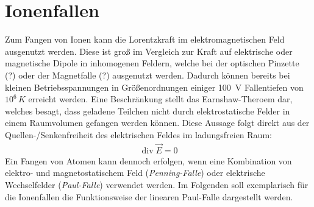 \documentclass[twocolumn]{revtex4}
\DeclareMathOperator{\divergence}{div}
\begin{document}
\section{Ionenfallen}
Zum Fangen von Ionen kann die Lorentzkraft im elektromagnetischen Feld ausgenutzt werden.
Diese ist groß im Vergleich zur Kraft auf elektrische oder magnetische Dipole in inhomogenen Feldern, welche bei der optischen Pinzette (?) oder der Magnetfalle (?) ausgenutzt werden.
Dadurch können bereits bei kleinen Betriebsspannungen in Größenordnungen einiger \SI{100}{V} Fallentiefen von $10^6 \, \si{K}$ erreicht werden.
Eine Beschränkung stellt das Earnshaw-Theroem dar, welches besagt, dass geladene Teilchen nicht durch elektrostatische Felder in einem Raumvolumen gefangen werden können.
Diese Aussage folgt direkt aus der Quellen-/Senkenfreiheit des elektrischen Feldes im ladungsfreien Raum:
\begin{align}
	\divergence \vec{E} = 0
\end{align}
Ein Fangen von Atomen kann dennoch erfolgen, wenn eine Kombination von elektro- und magnetostatischem Feld (\emph{Penning-Falle}) oder elektrische Wechselfelder (\emph{Paul-Falle}) verwendet werden.
Im Folgenden soll exemplarisch für die Ionenfallen die Funktionsweise der linearen Paul-Falle dargestellt werden.
\end{document}
